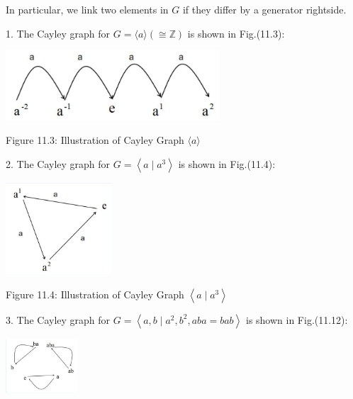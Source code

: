In particular, we link two elements in \(G\) if they differ by a generator rightside.

1. The Cayley graph for \(G = \langle a\rangle \left( { \cong  \mathbb{Z}}\right)\) is shown in Fig.(11.3):

\begin{center}
\includegraphics[max width=0.6\textwidth]{images/bo_d2bcsrref24c73avs720_110_448_1055_769_250_0.jpg}
\end{center}
\hspace*{3em} 

Figure 11.3: Illustration of Cayley Graph \(\langle a\rangle\)

2. The Cayley graph for \(G = \left\langle  {a \mid  {a}^{3}}\right\rangle\) is shown in Fig.(11.4):

\begin{center}
\includegraphics[max width=0.3\textwidth]{images/bo_d2bcsrref24c73avs720_110_618_1541_437_374_0.jpg}
\end{center}
\hspace*{3em} 

Figure 11.4: Illustration of Cayley Graph \(\left\langle  {a \mid  {a}^{3}}\right\rangle\)

3. The Cayley graph for \(G = \left\langle  {a,b \mid  {a}^{2},{b}^{2},{aba} = {bab}}\right\rangle\) is shown in Fig.(11.12):

\begin{center}
\includegraphics[max width=0.2\textwidth]{images/bo_d2bcsrref24c73avs720_111_811_303_314_242_0.jpg}
\end{center}
\hspace*{3em} 

